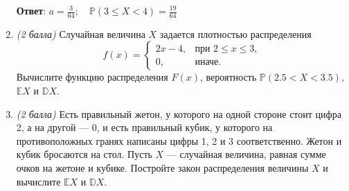 \documentclass{article}
\begin{document}
\begin{enumerate}
\textbf{Ответ}:
$a = \frac{3}{64}; \quad \mathbb{P}(3\leq X<4) = \frac{19}{64}$

\item \textit{(2 балла)} Случайная величина $X$ задается плотностью распределения
$$f(x)=
\begin{cases}
   2x-4, &\text{при } 2\leq x\leq3,\\
   0, &\text{иначе}.
 \end{cases}$$
Вычислите функцию распределения $F(x)$, вероятность $\mathbb{P}(2.5<X<3.5)$, $\mathbb{E}X$ и $\mathbb{D}X$.

\item \textit{(2 балла)} Есть правильный жетон, у которого на одной стороне стоит цифра 2, а на другой --- 0, и есть правильный кубик, у которого на противоположных гранях написаны цифры 1, 2 и 3 соответственно. Жетон и кубик бросаются на стол. Пусть $X$ --- случайная величина, равная сумме очков на жетоне и кубике. Постройте закон распределения величины $X$ и вычислите $\mathbb{E}X$ и $\mathbb{D}X$.



\end{enumerate}
\end{document}
